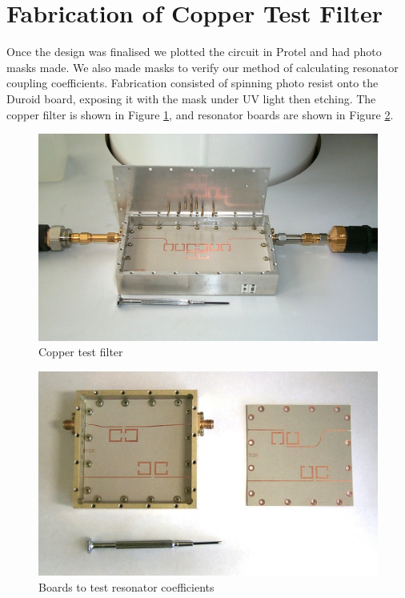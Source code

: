 \section{Fabrication of Copper Test Filter}

Once the design was finalised we plotted the circuit in Protel and had photo masks made. We also made masks to verify our method of calculating resonator coupling coefficients. Fabrication consisted of spinning photo resist onto the Duroid board, exposing it with the mask under UV light then etching. The copper filter is shown in Figure \ref{figure:test-copper-open}, and resonator boards are shown in Figure \ref{figure:test-resonator-open}.

\begin{figure}[ht]
\includegraphics[scale=0.25]{fig/test-copper-open.jpg}
\vspace{-1em}
\caption{Copper test filter}
\label{figure:test-copper-open}
\end{figure}

\begin{figure}[ht]
\includegraphics[scale=0.25]{fig/test-resonator-open.jpg}
\vspace{-1em}
\caption{Boards to test resonator coefficients}
\label{figure:test-resonator-open}
\end{figure}


